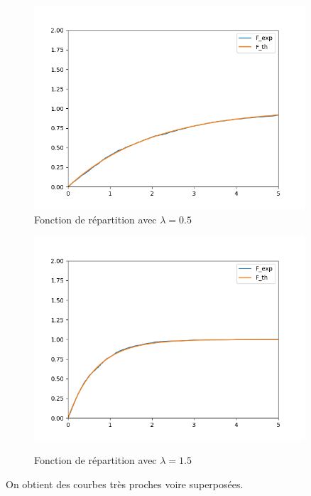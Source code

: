 \documentclass[12,french]{report}
\begin{document}
\begin{figure}[H]
    \begin{minipage}[c]{.50\linewidth}
        \centering
        \includegraphics[width=0.9\textwidth]{./Images/Lambda_0.5}\\
        \caption*{Fonction de répartition avec $\lambda=0.5$}
    \end{minipage}
    \hfill%
    \begin{minipage}[c]{.50\linewidth}
        \centering
        \includegraphics[width=0.9\textwidth]{./Images/Lambda_1.5}\\
        \caption*{Fonction de répartition avec $\lambda=1.5$}
    \end{minipage}
\end{figure}\vspace{0.3cm}

On obtient des courbes très proches voire superposées.\\
\end{document}
